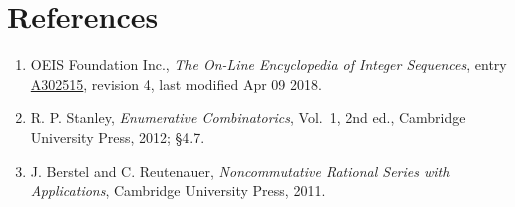 \documentclass[11pt]{article}
\theoremstyle{definition}
\begin{document}
\section{References}

\begin{enumerate}

\item OEIS Foundation Inc., \emph{The On-Line Encyclopedia of Integer Sequences}, entry \href{https://oeis.org/A302515}{A302515}, revision 4, last modified Apr 09 2018.

\item R. P. Stanley, \emph{Enumerative Combinatorics}, Vol.~1, 2nd ed., Cambridge University Press, 2012; \S4.7.

\item J. Berstel and C. Reutenauer, \emph{Noncommutative Rational Series with Applications}, Cambridge University Press, 2011.

\end{enumerate}
\end{document}
